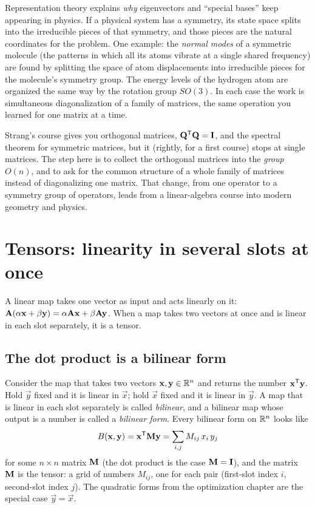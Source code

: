 \begin{aestheticbox}
Representation theory explains \emph{why} eigenvectors and ``special bases'' keep
appearing in physics. If a physical system has a symmetry, its state space splits
into the irreducible pieces of that symmetry, and those pieces are the natural
coordinates for the problem. One example: the \emph{normal modes} of a symmetric
molecule (the patterns in which all its atoms vibrate at a single shared frequency)
are found by splitting the space of atom displacements into irreducible pieces for
the molecule's symmetry group. The energy levels of the hydrogen atom are organized
the same way by the rotation group $SO(3)$. In each case the work is simultaneous
diagonalization of a family of matrices, the same operation you learned for one
matrix at a time.
\end{aestheticbox}

\begin{strangbox}
Strang's course gives you orthogonal matrices, $\mathbf{Q}^{\mathsf{T}}\mathbf{Q}=\mathbf{I}$, and the
spectral theorem for symmetric matrices, but it (rightly, for a first course) stops
at single matrices. The step here is to collect the orthogonal matrices into
the \emph{group} $O(n)$, and to ask for the common structure of a whole family of
matrices instead of diagonalizing one matrix. That change, from one
operator to a symmetry group of operators, leads from a linear-algebra
course into modern geometry and physics.
\end{strangbox}

\section{Tensors: linearity in several slots at once}
\label{ch37:tensors}

A linear map takes one vector as input and acts linearly on it:
$\mathbf{A}(\alpha\mathbf{x}+\beta\mathbf{y}) = \alpha\mathbf{A}\mathbf{x}+\beta\mathbf{A}\mathbf{y}$.
When a map takes two vectors at once and is linear in each slot
separately, it is a tensor.

\subsection{The dot product is a bilinear form}
\label{ch37:bilinear}

Consider the map that takes two vectors $\mathbf{x},\mathbf{y}\in\mathbb{R}^n$ and returns the
number $\mathbf{x}^{\mathsf{T}}\mathbf{y}$. Hold $\vec{y}$ fixed and it is linear in $\vec{x}$; hold
$\vec{x}$ fixed and it is linear in $\vec{y}$. A map that is linear in each slot
separately is called \emph{bilinear}, and a bilinear map whose output is a number is
called a \emph{bilinear form}. Every bilinear form on $\mathbb{R}^n$ looks like
\[
  B(\mathbf{x},\mathbf{y}) = \mathbf{x}^{\mathsf{T}}\mathbf{M}\mathbf{y}
  = \sum_{i,j} M_{ij}\, x_i\, y_j
\]
for some $n\times n$ matrix $\mathbf{M}$ (the dot product is the case $\mathbf{M}=\mathbf{I}$),
and the matrix $\mathbf{M}$ is the tensor: a grid of numbers $M_{ij}$, one for
each pair (first-slot index $i$, second-slot index $j$). The quadratic forms from the
optimization chapter are the special case $\vec{y}=\vec{x}$.

